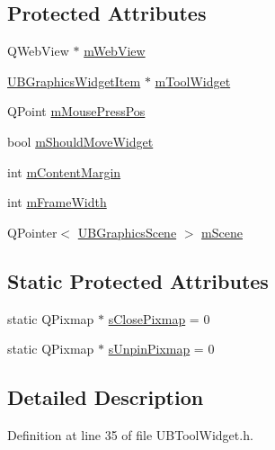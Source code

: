 \subsection*{Protected Attributes}
\begin{DoxyCompactItemize}
\item 
Q\-Web\-View $\ast$ \hyperlink{class_u_b_tool_widget_aa598afa73c217e3eb4842e18835e92d9}{m\-Web\-View}
\item 
\hyperlink{class_u_b_graphics_widget_item}{U\-B\-Graphics\-Widget\-Item} $\ast$ \hyperlink{class_u_b_tool_widget_adeda56949b7ea896deaf91eb0da771aa}{m\-Tool\-Widget}
\item 
Q\-Point \hyperlink{class_u_b_tool_widget_a0459b98ce8907d4c8b0e5e22c8c4d5fc}{m\-Mouse\-Press\-Pos}
\item 
bool \hyperlink{class_u_b_tool_widget_a3cb3060f6d7a0f0ee521af8c55a90536}{m\-Should\-Move\-Widget}
\item 
int \hyperlink{class_u_b_tool_widget_aea71c7869e1b87efe3246327a9ab6e1b}{m\-Content\-Margin}
\item 
int \hyperlink{class_u_b_tool_widget_a080c2b025eb3bffdba9c1dc5b717ed1b}{m\-Frame\-Width}
\item 
Q\-Pointer$<$ \hyperlink{class_u_b_graphics_scene}{U\-B\-Graphics\-Scene} $>$ \hyperlink{class_u_b_tool_widget_a4bce41d7e4b1c4fb4ac9e9c6c9b7b018}{m\-Scene}
\end{DoxyCompactItemize}
\subsection*{Static Protected Attributes}
\begin{DoxyCompactItemize}
\item 
static Q\-Pixmap $\ast$ \hyperlink{class_u_b_tool_widget_acd63ebbed200f2bed88266e8886a88d1}{s\-Close\-Pixmap} = 0
\item 
static Q\-Pixmap $\ast$ \hyperlink{class_u_b_tool_widget_a19de57977d73ad9520ef5a4978340aa7}{s\-Unpin\-Pixmap} = 0
\end{DoxyCompactItemize}


\subsection{Detailed Description}


Definition at line 35 of file U\-B\-Tool\-Widget.\-h.




